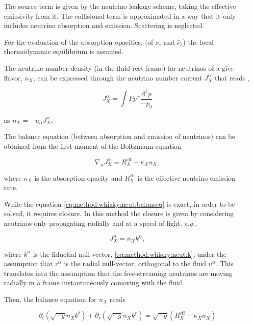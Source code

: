\documentclass[11pt,a4paper,headinclude=true,DIV=14,BCOR=8mm,chapterprefix,listof=totoc,twoside,openright,abstracton]{scrbook}
\newcommand{\dd}{\text{d}}
\begin{document}
The source term is given by the neutrino leakage scheme, taking the effective emissivity from it.
The collisional term is approximated in a way that it only includes neutrino absorption and emission. Scattering is neglected.

For the evaluation of the absorption opacities, (of $\nu_{e}$ and $\bar{\nu}_{e}$) the local thermodynamic equilibrium is assumed.

The neutrino number density (in the fluid rest frame) for neutrinos of a give flavor, $n_X$, can be expressed through the neutrino number current $J_{X}^{\alpha}$ that reads \cite{Lindquist:1966},

\begin{equation}
J_{X}^{\alpha} = \int F p^{\alpha} \frac{\dd^3 p}{-p_0}
\end{equation}

as $n_X = - u_{\alpha} J_{X}^{\alpha}$.

The balance equation (between absorption and emission of neutrinos) can be obtained from the 
first moment of the Boltzmann equation \cite{Thorne:1981,Shibata:2011kx}

\begin{equation}
\label{eq:method:whisky:neut:balanseq}
\nabla_{\alpha}J_{X}^{\alpha} = R_{X}^{\text{eff}} - \kappa_X n_X,
\end{equation}

where $\kappa_X$ is the absorption opacity and $R_X^{\text{eff}}$ is the effective neutrino emission rate.

While the equation \eqref{eq:method:whisky:neut:balanseq} is exact, in order to be solved, it requires closure. 
In this method the closure is given by considering neutrinos only propagating radially and at a speed of light, \textit{e.g.,}

\begin{equation}
J_{X}^{\alpha} = n_X k^{\alpha},
\end{equation}

where $k^{\alpha}$ is the fiductial null vector, \eqref{eq:method:whisky:neut:k}, under the assumption that $r^{\alpha}$ is the radial null-vector, orthogonal to the fluid $u^{\alpha}$.
This translates into the assumption that the free-streaming neutrinos are moving radially in a frame instantaneously comoving with the fluid.

Then, the balance equation for $n_X$ reads

\begin{equation}
\label{eq:mehtod:whisky:neut:balanseq2}
\partial_t(\sqrt{-g}n_X k^t) + \partial_r(\sqrt{-g}n_X k^r) = \sqrt{-g}(R^{\text{eff}}_{X} - \kappa_X n_X)
\end{equation}
\end{document}
